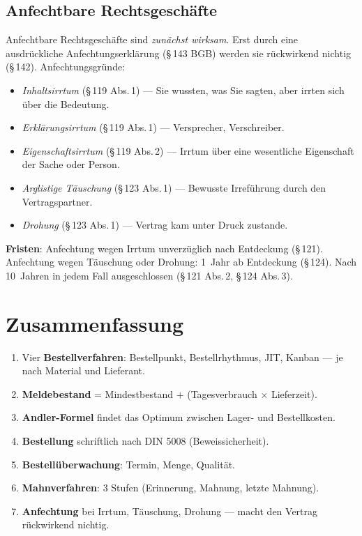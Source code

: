 \documentclass[11pt, a4paper]{article}
\begin{document}
\subsection{Anfechtbare Rechtsgeschäfte}

Anfechtbare Rechtsgeschäfte sind \emph{zunächst wirksam}. Erst durch eine ausdrückliche
Anfechtungs­erklärung (§\,143 BGB) werden sie rückwirkend nichtig (§\,142). Anfechtungs­gründe:

\begin{itemize}[itemsep=0pt]
  \item \emph{Inhalts­irrtum} (§\,119 Abs.\,1) --- Sie wussten, was Sie sagten, aber irrten sich über die Bedeutung.
  \item \emph{Erklärungs­irrtum} (§\,119 Abs.\,1) --- Versprecher, Verschreiber.
  \item \emph{Eigenschafts­irrtum} (§\,119 Abs.\,2) --- Irrtum über eine wesentliche Eigenschaft der Sache oder Person.
  \item \emph{Arglistige Täuschung} (§\,123 Abs.\,1) --- Bewusste Irreführung durch den Vertragspartner.
  \item \emph{Drohung} (§\,123 Abs.\,1) --- Vertrag kam unter Druck zustande.
\end{itemize}

\begin{merksatz}
\textbf{Fristen}: Anfechtung wegen Irrtum unverzüglich nach Entdeckung (§\,121).
Anfechtung wegen Täuschung oder Drohung: 1~Jahr ab Entdeckung (§\,124). Nach 10~Jahren
in jedem Fall ausgeschlossen (§\,121 Abs.\,2, §\,124 Abs.\,3).
\end{merksatz}

\section{Zusammenfassung}

\begin{enumerate}
  \item Vier \textbf{Bestellverfahren}: Bestellpunkt, Bestellrhythmus, JIT, Kanban --- je nach Material und Lieferant.
  \item \textbf{Meldebestand} = Mindestbestand $+$ (Tagesverbrauch $\times$ Lieferzeit).
  \item \textbf{Andler-Formel} findet das Optimum zwischen Lager- und Bestellkosten.
  \item \textbf{Bestellung} schriftlich nach DIN 5008 (Beweissicherheit).
  \item \textbf{Bestellüberwachung}: Termin, Menge, Qualität.
  \item \textbf{Mahnverfahren}: 3 Stufen (Erinnerung, Mahnung, letzte Mahnung).
  \item \textbf{Anfechtung} bei Irrtum, Täuschung, Drohung --- macht den Vertrag rückwirkend nichtig.
\end{enumerate}
\end{document}
